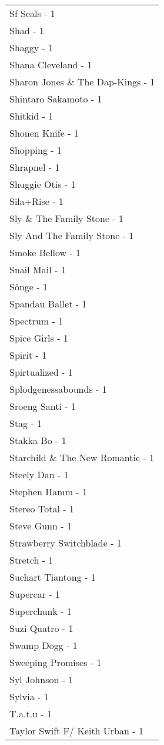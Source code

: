 \documentclass[
]{article}
\begin{document}
\begin{longtable}{l}
Sf Seals - 1 \\ 
Shad - 1 \\ 
Shaggy - 1 \\ 
Shana Cleveland - 1 \\ 
Sharon Jones \& The Dap-Kings - 1 \\ 
Shintaro Sakamoto - 1 \\ 
Shitkid - 1 \\ 
Shonen Knife - 1 \\ 
Shopping - 1 \\ 
Shrapnel - 1 \\ 
Shuggie Otis - 1 \\ 
Sila+Rise - 1 \\ 
Sly \& The Family Stone - 1 \\ 
Sly And The Family Stone - 1 \\ 
Smoke Bellow - 1 \\ 
Snail Mail - 1 \\ 
Sônge - 1 \\ 
Spandau Ballet - 1 \\ 
Spectrum - 1 \\ 
Spice Girls - 1 \\ 
Spirit - 1 \\ 
Spirtualized - 1 \\ 
Splodgenessabounds - 1 \\ 
Sroeng Santi - 1 \\ 
Stag - 1 \\ 
Stakka Bo - 1 \\ 
Starchild \& The New Romantic - 1 \\ 
Steely Dan - 1 \\ 
Stephen Hamm - 1 \\ 
Stereo Total - 1 \\ 
Steve Gunn - 1 \\ 
Strawberry Switchblade - 1 \\ 
Stretch - 1 \\ 
Suchart Tiantong - 1 \\ 
Supercar - 1 \\ 
Superchunk - 1 \\ 
Suzi Quatro - 1 \\ 
Swamp Dogg - 1 \\ 
Sweeping Promises - 1 \\ 
Syl Johnson - 1 \\ 
Sylvia - 1 \\ 
T.a.t.u - 1 \\ 
Taylor Swift F/ Keith Urban - 1 \\ 

\end{longtable}
\end{document}
